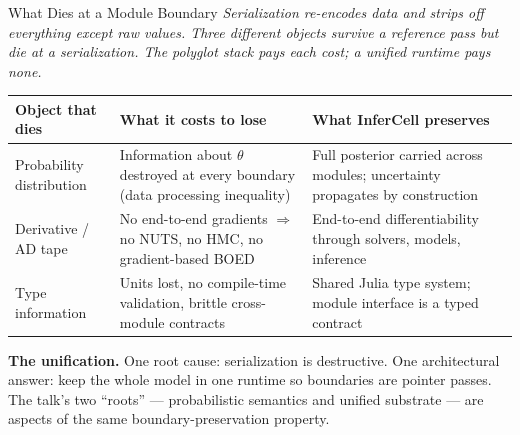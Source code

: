 \documentclass[aspectratio=169]{beamer}
\begin{document}
\begin{frame}[noframenumbering]{What Dies at a Module Boundary}
	\footnotesize
	\textit{Serialization re-encodes data and strips off everything except raw values. Three different objects survive a reference pass but die at a serialization. The polyglot stack pays each cost; a unified runtime pays none.}

	\bigskip
	\centering
	\renewcommand{\arraystretch}{1.3}
	\begin{tabular}{p{3cm} p{4.8cm} p{4.8cm}}
		\toprule
		\textbf{Object that dies} & \textbf{What it costs to lose} & \textbf{What InferCell preserves} \\
		\midrule
		Probability distribution & Information about $\theta$ destroyed at every boundary (data processing inequality) & Full posterior carried across modules; uncertainty propagates by construction \\
		Derivative / AD tape     & No end-to-end gradients $\Rightarrow$ no NUTS, no HMC, no gradient-based BOED & End-to-end differentiability through solvers, models, inference \\
		Type information         & Units lost, no compile-time validation, brittle cross-module contracts & Shared Julia type system; module interface is a typed contract \\
		\bottomrule
	\end{tabular}

	\bigskip
	\raggedright
	\textbf{The unification.} One root cause: serialization is destructive. One architectural answer: keep the whole model in one runtime so boundaries are pointer passes. The talk's two ``roots'' --- probabilistic semantics and unified substrate --- are aspects of the same boundary-preservation property.
\end{frame}
\end{document}
